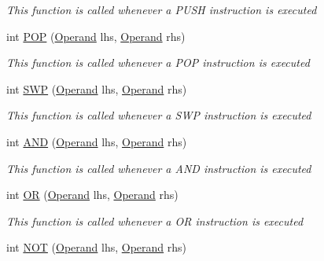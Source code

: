 \begin{DoxyCompactItemize}
\begin{DoxyCompactList}\small\item\em This function is called whenever a P\+U\+S\+H instruction is executed \end{DoxyCompactList}\item 
int \hyperlink{class_c_p_u___o_s___simulator_1_1_c_p_u_1_1_instruction_a16a47493684bb30a289d337188fb77b6}{P\+O\+P} (\hyperlink{class_c_p_u___o_s___simulator_1_1_c_p_u_1_1_operand}{Operand} lhs, \hyperlink{class_c_p_u___o_s___simulator_1_1_c_p_u_1_1_operand}{Operand} rhs)
\begin{DoxyCompactList}\small\item\em This function is called whenever a P\+O\+P instruction is executed \end{DoxyCompactList}\item 
int \hyperlink{class_c_p_u___o_s___simulator_1_1_c_p_u_1_1_instruction_ac86363232497de67ac268dd8942294a3}{S\+W\+P} (\hyperlink{class_c_p_u___o_s___simulator_1_1_c_p_u_1_1_operand}{Operand} lhs, \hyperlink{class_c_p_u___o_s___simulator_1_1_c_p_u_1_1_operand}{Operand} rhs)
\begin{DoxyCompactList}\small\item\em This function is called whenever a S\+W\+P instruction is executed \end{DoxyCompactList}\item 
int \hyperlink{class_c_p_u___o_s___simulator_1_1_c_p_u_1_1_instruction_a4b5e469acee3a32016220af620b98650}{A\+N\+D} (\hyperlink{class_c_p_u___o_s___simulator_1_1_c_p_u_1_1_operand}{Operand} lhs, \hyperlink{class_c_p_u___o_s___simulator_1_1_c_p_u_1_1_operand}{Operand} rhs)
\begin{DoxyCompactList}\small\item\em This function is called whenever a A\+N\+D instruction is executed \end{DoxyCompactList}\item 
int \hyperlink{class_c_p_u___o_s___simulator_1_1_c_p_u_1_1_instruction_a32adcd85bab5adfeeb4effa90275dee5}{O\+R} (\hyperlink{class_c_p_u___o_s___simulator_1_1_c_p_u_1_1_operand}{Operand} lhs, \hyperlink{class_c_p_u___o_s___simulator_1_1_c_p_u_1_1_operand}{Operand} rhs)
\begin{DoxyCompactList}\small\item\em This function is called whenever a O\+R instruction is executed \end{DoxyCompactList}\item 
int \hyperlink{class_c_p_u___o_s___simulator_1_1_c_p_u_1_1_instruction_ab639a616b188c9816dd1775ebda837d4}{N\+O\+T} (\hyperlink{class_c_p_u___o_s___simulator_1_1_c_p_u_1_1_operand}{Operand} lhs, \hyperlink{class_c_p_u___o_s___simulator_1_1_c_p_u_1_1_operand}{Operand} rhs)

\end{DoxyCompactItemize}
